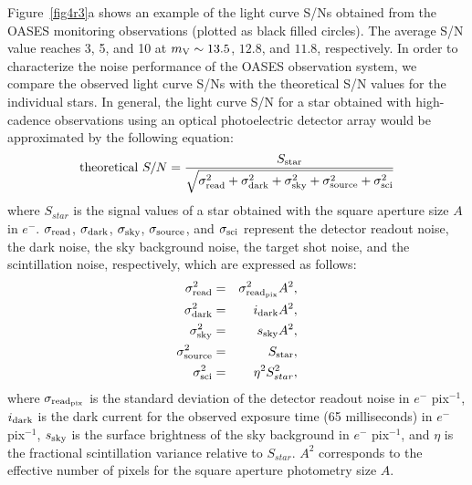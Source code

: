 \documentclass{pasj01}
\newcommand{\void}[1]{}
\renewcommand{\textcolor}{\void}
\begin{document}
Figure~\ref{fig4r3}a shows an example of the light curve S/Ns 
obtained from the OASES monitoring observations (plotted as black filled circles).
The average S/N value reaches 3, 5, and 10 at $m_{\rm V} \sim 13.5$, $12.8$, and $11.8$, respectively.
In order to characterize the noise performance of the OASES observation system, 
we compare the observed light curve S/Ns 
with the theoretical S/N values for the individual stars.
In general, the light curve S/N for a star  
obtained with high-cadence observations
using an optical photoelectric detector array 
would be approximated by the following equation: 
\begin{eqnarray}
\textcolor{red}{
	{\rm theoretical} \ S/N = \frac{S_{\rm star}}{\sqrt{\sigma_{\rm read}^{2}  + \sigma_{\rm dark}^{2} + \sigma_{\rm sky}^{2} + \sigma_{\rm source}^{2} +\sigma_{\rm sci}^{2}}}
	}
\end{eqnarray}
where 
$S_{star}$ is the signal values of a star obtained with the square aperture size  $A$ in $e^{-}$. %
$\sigma_{\rm read}$, $\sigma_{\rm dark}$, $\sigma_{\rm sky}$, $\sigma_{\rm source}$, and $\sigma_{\rm sci}$
represent the detector readout noise, the dark noise, the sky background noise, the target shot noise, and the scintillation noise, respectively, 
which are expressed as follows:
\begin{eqnarray}
\sigma_{\rm read}^2 &=& \sigma_{\rm read_{\rm pix}}^{2}  A^2, \\
\sigma_{\rm dark}^2 &=& i_{\rm dark}   A^2,  \\
\sigma_{\rm sky}^2     &=& s_{\rm sky}  A^2,  \\ %
\sigma_{\rm source}^2 &=& S_{\rm star},   \\
\sigma_{\rm sci}^2 &=&  \eta^2 S_{star}^2,
\end{eqnarray}
where 
$\sigma_{\rm read_{\rm pix}}$ is the standard deviation of the detector readout noise in $e^{-}$ pix$^{-1}$,
$i_{\rm dark}$ is the dark current for the observed exposure time (65 milliseconds) in $e^{-}$ pix$^{-1}$,
$s_{\rm sky}$ is the surface brightness of the sky background in $e^{-}$ pix$^{-1}$,
and $ \eta $ is the fractional scintillation variance relative to $S_{star}$.
$A^2$ corresponds to the effective number of pixels for the square aperture photometry size $A$. 
\end{document}
